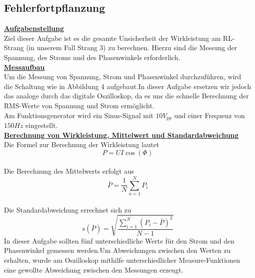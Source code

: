 \documentclass[a4paper,12pt]{article}
\begin{document}
	\subsection{Fehlerfortpflanzung}
	\underline{\textbf{Aufgabenstellung}} \\ \newline
	\noindent
	Ziel dieser Aufgabe ist es die gesamte Unsicherheit der Wirkleistung am RL-Strang (in unserem Fall Strang 3) zu berechnen. Hierzu sind die Messung der Spannung, des Stroms und des Phasenwinkels erforderlich. \\ \newline
	\noindent
	\underline{\textbf{Messaufbau}}
	\\ \newline
	Um die Messung von Spannung, Strom und Phasenwinkel durchzuführen, wird die Schaltung wie in Abbildung 4 aufgebaut.\newline In dieser Aufgabe ersetzen wir jedoch das analoge durch das digitale Oszilloskop, da es uns die schnelle Berechnung der RMS-Werte von Spannung und Strom ermöglicht.\\ \newline
	Am Funktionsgenerator wird ein Sinus-Signal mit $10V_{pp}$ und einer Frequenz von $150Hz$ eingestellt.\\ \newline
	\noindent
	\underline{\textbf{Berechnung von Wirkleistung, Mittelwert und Standardabweichung}}\\ \newline
	Die Formel zur Berechnung der Wirkleistung lautet \[
	P = U I \cos(\Phi)
	\]\\ \newline
	Die Berechnung des Mittelwerts erfolgt aus 
	\[\displaystyle \bar{P}=\frac{1}{N}\sum_{n=1}^N P_i \] \\ \newline
	Die Standardabweichung errechnet sich zu \[\displaystyle s(\bar{P})=\sqrt{\frac{\sum_{i=1}^N (P_i-\bar{P})^2}{N-1}} \]
	In dieser Aufgabe sollten fünf unterschiedliche Werte für den Strom und den Phasenwinkel gemessen werden.\newline Um Abweichungen zwischen den Werten zu erhalten, wurde am Oszilloskop mithilfe unterschiedlicher Measure-Funktionen eine gewollte Abweichung zwischen den Messungen erzeugt.\\ \newline
\end{document}
